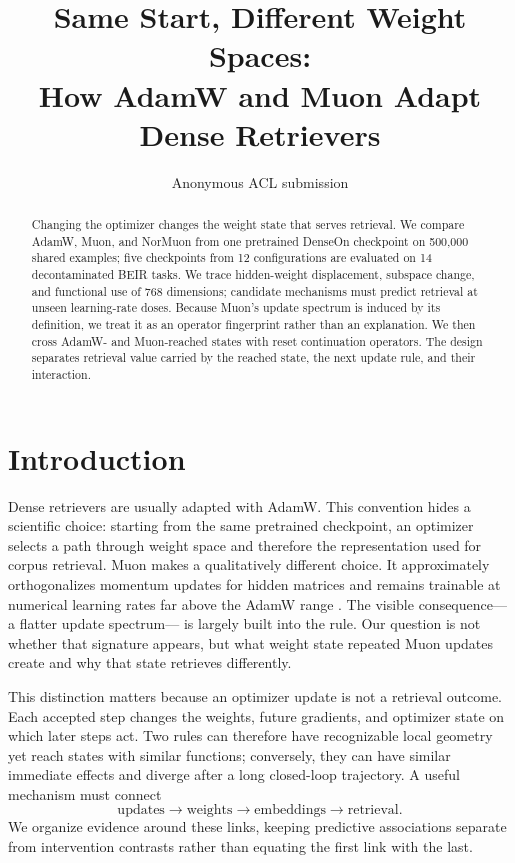 \documentclass[11pt]{article}
\title{Same Start, Different Weight Spaces:\\
How AdamW and Muon Adapt Dense Retrievers}
\author{Anonymous ACL submission}
\begin{document}
\maketitle

\begin{abstract}
Changing the optimizer changes the weight state that serves retrieval. We compare AdamW, Muon, and
NorMuon from one pretrained DenseOn checkpoint on 500,000 shared examples; five checkpoints from
12 configurations are evaluated on 14 decontaminated BEIR tasks. \CorrectedAbstractFinding{} We
trace hidden-weight displacement, subspace change, and functional use of 768 dimensions; candidate
mechanisms must predict retrieval at unseen learning-rate doses. Because Muon's update spectrum is
induced by its definition, we treat it as an operator fingerprint rather than an explanation. We
then cross AdamW- and Muon-reached states with reset continuation operators.
\StateOperatorAbstractFinding{} The design separates retrieval value carried by the reached state,
the next update rule, and their interaction.
\end{abstract}

\section{Introduction}

Dense retrievers are usually adapted with AdamW. This convention hides a scientific choice:
starting from the same pretrained checkpoint, an optimizer selects a path through weight space and
therefore the representation used for corpus retrieval. Muon makes a qualitatively different
choice. It approximately orthogonalizes momentum updates for hidden matrices and remains trainable
at numerical learning rates far above the AdamW range
\citep{loshchilov2019decoupled,liu2025muon}. The visible consequence---a flatter update spectrum---
is largely built into the rule. Our question is not whether that signature appears, but what weight
state repeated Muon updates create and why that state retrieves differently.

This distinction matters because an optimizer update is not a retrieval outcome. Each accepted
step changes the weights, future gradients, and optimizer state on which later steps act. Two rules
can therefore have recognizable local geometry yet reach states with similar functions; conversely,
they can have similar immediate effects and diverge after a long closed-loop trajectory. A useful
mechanism must connect
\begin{equation*}
\text{updates}\rightarrow\text{weights}\rightarrow\text{embeddings}
\rightarrow\text{retrieval}.
\end{equation*}
We organize evidence around these links, keeping predictive associations separate from intervention
contrasts rather than equating the first link with the last.
\end{document}
